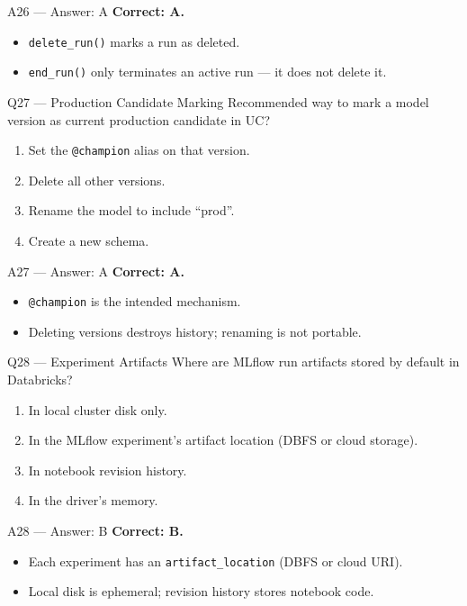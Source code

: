 \documentclass[aspectratio=169,10pt]{beamer}
\begin{document}
	\begin{frame}{A26 — Answer: A}
		\textbf{Correct: A.}
		\begin{itemize}
			\item \texttt{delete\_run()} marks a run as deleted.
			\item \texttt{end\_run()} only terminates an active run — it does not delete it.
		\end{itemize}
	\end{frame}
	
	\begin{frame}{Q27 — Production Candidate Marking}
		Recommended way to mark a model version as current production candidate in UC?
		\begin{enumerate}[label=\Alph*.]
			\item Set the \texttt{@champion} alias on that version.
			\item Delete all other versions.
			\item Rename the model to include ``prod''.
			\item Create a new schema.
		\end{enumerate}
	\end{frame}
	
	\begin{frame}{A27 — Answer: A}
		\textbf{Correct: A.}
		\begin{itemize}
			\item \texttt{@champion} is the intended mechanism.
			\item Deleting versions destroys history; renaming is not portable.
		\end{itemize}
	\end{frame}
	
	\begin{frame}{Q28 — Experiment Artifacts}
		Where are MLflow run artifacts stored by default in Databricks?
		\begin{enumerate}[label=\Alph*.]
			\item In local cluster disk only.
			\item In the MLflow experiment's artifact location (DBFS or cloud storage).
			\item In notebook revision history.
			\item In the driver's memory.
		\end{enumerate}
	\end{frame}
	
	\begin{frame}{A28 — Answer: B}
		\textbf{Correct: B.}
		\begin{itemize}
			\item Each experiment has an \texttt{artifact\_location} (DBFS or cloud URI).
			\item Local disk is ephemeral; revision history stores notebook code.
		\end{itemize}
	\end{frame}
	
\end{document}
